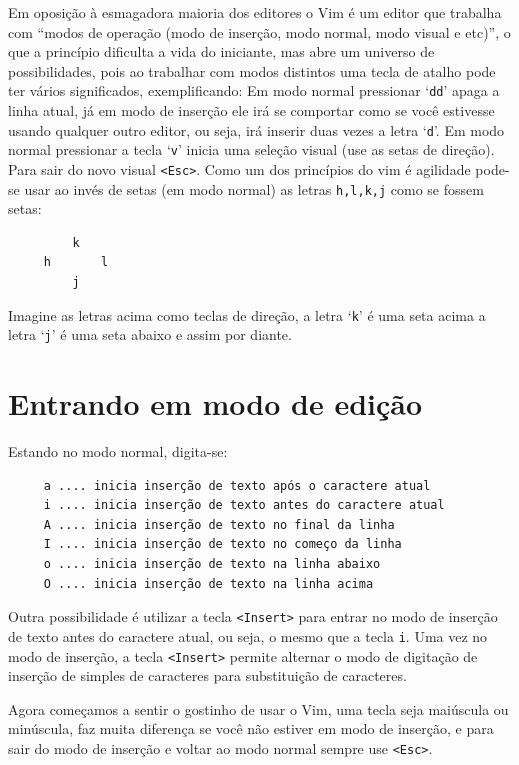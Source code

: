 Em oposição à esmagadora maioria dos editores o Vim é um editor que trabalha
com ``modos de operação (modo de inserção, modo normal, modo visual e etc)'', o
que a princípio dificulta a vida do iniciante, mas abre um universo de
possibilidades, pois ao trabalhar com modos distintos uma tecla de atalho pode
ter vários significados, exemplificando: Em
modo normal pressionar `{\tt dd}' apaga a linha atual, já em modo de inserção
ele irá se comportar como se você estivesse usando qualquer outro editor, ou
seja, irá inserir duas vezes a letra `{\tt d}'.  Em modo normal pressionar a
tecla `{\tt v}' inicia uma seleção visual (use as setas de direção).  Para sair
do novo visual \verb|<Esc>|.  Como um dos princípios do vim é agilidade pode-se
usar ao invés de setas (em modo normal) as letras {\tt h,l,k,j} como se fossem
setas:

\begin{verbatim}
         k
     h       l
         j
\end{verbatim}

Imagine as letras acima como teclas de direção, a letra `{\tt k}' é uma seta acima
a letra `{\tt j}' é uma seta abaixo e assim por diante.

\section{Entrando em modo de edição}\label{Entrando em modo de edição}
Estando no modo normal, digita-se:
\begin{verbatim}
     a .... inicia inserção de texto após o caractere atual
     i .... inicia inserção de texto antes do caractere atual
     A .... inicia inserção de texto no final da linha
     I .... inicia inserção de texto no começo da linha
     o .... inicia inserção de texto na linha abaixo
     O .... inicia inserção de texto na linha acima
\end{verbatim}

Outra possibilidade é utilizar a tecla \verb|<Insert>| para entrar no modo de inserção de
texto antes do caractere atual, ou seja, o mesmo que a tecla \verb|i|. Uma vez no modo de 
inserção, a tecla \verb|<Insert>| permite alternar o modo de digitação de inserção de 
simples de caracteres para substituição de caracteres.

Agora começamos a sentir o gostinho de usar o Vim, uma tecla seja
maiúscula ou minúscula, faz muita diferença se você não estiver em
modo de inserção, e para sair do modo de inserção e voltar ao modo normal sempre 
use \verb|<Esc>|.

